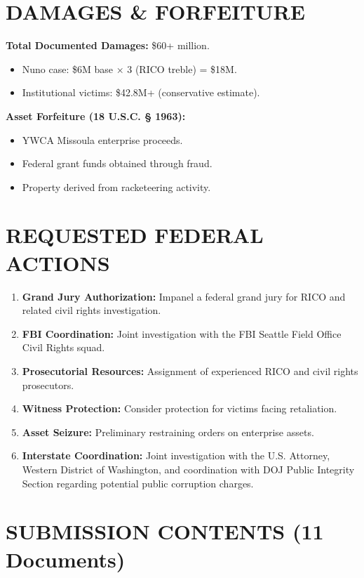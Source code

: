 \documentclass[12pt,oneside]{article}
\begin{document}
\begin{flushleft}
\section*{DAMAGES \& FORFEITURE}

\textbf{Total Documented Damages:} \$60+ million.

\begin{itemize}
\item Nuno case: \$6M base × 3 (RICO treble) = \$18M.
\item Institutional victims: \$42.8M+ (conservative estimate).
\end{itemize}

\textbf{Asset Forfeiture (18 U.S.C. § 1963):}

\begin{itemize}
\item YWCA Missoula enterprise proceeds.
\item Federal grant funds obtained through fraud.
\item Property derived from racketeering activity.
\end{itemize}

\section*{REQUESTED FEDERAL ACTIONS}

\begin{enumerate}
\item \textbf{Grand Jury Authorization:} Impanel a federal grand jury for RICO and related civil rights investigation.
\item \textbf{FBI Coordination:} Joint investigation with the FBI Seattle Field Office Civil Rights squad.
\item \textbf{Prosecutorial Resources:} Assignment of experienced RICO and civil rights prosecutors.
\item \textbf{Witness Protection:} Consider protection for victims facing retaliation.
\item \textbf{Asset Seizure:} Preliminary restraining orders on enterprise assets.
\item \textbf{Interstate Coordination:} Joint investigation with the U.S. Attorney, Western District of Washington, and coordination with DOJ Public Integrity Section regarding potential public corruption charges.
\end{enumerate}

\section*{SUBMISSION CONTENTS (11 Documents)}


\end{flushleft}
\end{document}
